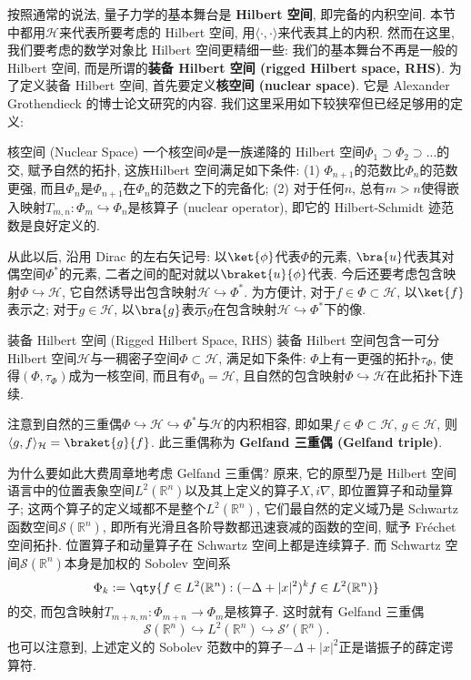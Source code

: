 
     按照通常的说法, 量子力学的基本舞台是 \textbf{Hilbert 空间}, 即完备的内积空间. 本节中都用$\mathcal{H}$来代表所要考虑的 Hilbert 空间, 用$\langle\cdot,\cdot\rangle$来代表其上的内积. 然而在这里, 我们要考虑的数学对象比 Hilbert 空间更精细一些: 我们的基本舞台不再是一般的 Hilbert 空间, 而是所谓的\textbf{装备 Hilbert 空间 (rigged Hilbert space, RHS)}. 为了定义装备 Hilbert 空间, 首先要定义\textbf{核空间 (nuclear space)}. 它是 Alexander Grothendieck 的博士论文研究的内容. 我们这里采用如下较狭窄但已经足够用的定义:

\begin{definition}{核空间 (Nuclear Space)}
一个核空间$\Phi$是一族递降的 Hilbert 空间$\Phi_1\supset\Phi_2\supset...$的交, 赋予自然的拓扑, 这族Hilbert 空间满足如下条件: (1) $\Phi_{n+1}$的范数比$\Phi_n$的范数更强, 而且$\Phi_n$是$\Phi_{n+1}$在$\Phi_n$的范数之下的完备化; (2) 对于任何$n$, 总有$m>n$使得嵌入映射$T_{m,n}:\Phi_{m}\hookrightarrow\Phi_n$是核算子 (nuclear operator), 即它的 Hilbert-Schmidt 迹范数是良好定义的.
\end{definition}

    从此以后, 沿用 Dirac 的左右矢记号: 以$\ket{\phi}$代表$\Phi$的元素, $\bra{u}$代表其对偶空间$\Phi^*$的元素, 二者之间的配对就以$\braket{u}{\phi}$代表. 今后还要考虑包含映射$\Phi\hookrightarrow\mathcal{H}$, 它自然诱导出包含映射$\mathcal{H}\hookrightarrow\Phi^*$. 为方便计, 对于$f\in\Phi\subset\mathcal{H}$, 以$\ket{f}$表示之; 对于$g\in\mathcal{H}$, 以$\bra{g}$表示$g$在包含映射$\mathcal{H}\hookrightarrow\Phi^*$下的像.

\begin{definition}{装备 Hilbert 空间 (Rigged Hilbert Space, RHS)}
装备 Hilbert 空间包含一可分 Hilbert 空间$\mathcal{H}$与一稠密子空间$\Phi\subset\mathcal{H}$, 满足如下条件: $\Phi$上有一更强的拓扑$\tau_\Phi$, 使得$(\Phi,\tau_\Phi)$成为一核空间, 而且有$\Phi_0=\mathcal{H}$, 且自然的包含映射$\Phi\hookrightarrow\mathcal{H}$在此拓扑下连续.
\end{definition}

    注意到自然的三重偶$\Phi\hookrightarrow\mathcal{H}\hookrightarrow\Phi^*$与$\mathcal{H}$的内积相容, 即如果$f\in\Phi\subset\mathcal{H}$, $g\in\mathcal{H}$, 则$\langle g,f\rangle_{\mathcal{H}}=\braket{g}{f}$. 此三重偶称为 \textbf{Gelfand 三重偶 (Gelfand triple)}.

    为什么要如此大费周章地考虑 Gelfand 三重偶? 原来, 它的原型乃是 Hilbert 空间语言中的位置表象空间$L^2(\mathbb{R}^n)$以及其上定义的算子$X,i\nabla$, 即位置算子和动量算子; 这两个算子的定义域都不是整个$L^2(\mathbb{R}^n)$, 它们最自然的定义域乃是 Schwartz 函数空间$\mathcal{S}(\mathbb{R}^n)$, 即所有光滑且各阶导数都迅速衰减的函数的空间, 赋予 Fréchet 空间拓扑. 位置算子和动量算子在 Schwartz 空间上都是连续算子. 而 Schwartz 空间$\mathcal{S}(\mathbb{R}^n)$本身是加权的 Sobolev 空间系
$$
\Phi_k := \qty{f \in L^2 (\mathbb{R}^n): (-\Delta + |x|^ 2)^{k} f \in L^2 (\mathbb{R}^n) }
$$
的交, 而包含映射$T_{m+n,m}:\Phi_{m+n}\to\Phi_m$是核算子. 这时就有 Gelfand 三重偶$$
\mathcal{S}(\mathbb{R}^n)\hookrightarrow L^2(\mathbb{R}^n)\hookrightarrow \mathcal{S}'(\mathbb{R}^n).
$$也可以注意到, 上述定义的 Sobolev 范数中的算子$-\Delta+|x|^2$正是谐振子的薛定谔算符.

